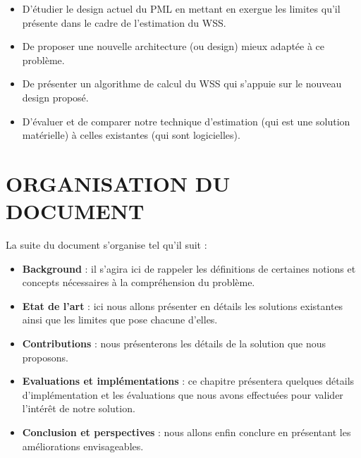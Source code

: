 \begin{itemize}[label=, font=\large \color{darkorange}]
    \item D'étudier le design actuel du PML en mettant en exergue les limites qu'il présente dans le cadre de l'estimation du WSS.
    \item De proposer une nouvelle architecture (ou design) mieux adaptée à ce problème.
    \item De présenter un algorithme de calcul du WSS qui s'appuie sur le nouveau design proposé.
    \item D'évaluer et de comparer notre technique d'estimation (qui est une solution matérielle) à celles existantes (qui sont logicielles).
\end{itemize}

\section*{ORGANISATION DU DOCUMENT}
La suite du document s'organise tel qu'il suit : 
\begin{itemize}[label=, font=\large \color{darkorange}]
    \item \textbf{Background} : il s'agira ici de rappeler les définitions de certaines notions et concepts nécessaires à la compréhension du problème.
    \item \textbf{Etat de l'art} : ici nous allons présenter en détails les solutions existantes ainsi que les limites que pose chacune d'elles.
    \item \textbf{Contributions} : nous présenterons les détails de la solution que nous proposons.
    \item \textbf{Evaluations et implémentations} : ce chapitre présentera quelques détails d’implémentation et les évaluations que nous avons effectuées pour valider l’intérêt de notre solution.
    \item \textbf{Conclusion et perspectives} : nous allons enfin conclure en présentant les améliorations envisageables.
\end{itemize}

